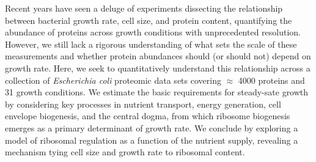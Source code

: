 Recent years have seen a deluge of experiments dissecting the relationship
between bacterial growth rate, cell size, and protein content, quantifying the
abundance of proteins across growth conditions with unprecedented
resolution. However, we still lack a rigorous understanding of what sets the
scale of these measurements and whether protein abundances should (or should not)
depend on growth rate. Here, we seek to quantitatively understand this
relationship across a collection of
\textit{Escherichia coli} proteomic data sets covering $\approx$ 4000 proteins
and 31 growth conditions. We estimate the basic requirements for steady-sate
growth by considering key processes in nutrient transport, energy generation, cell envelope
biogenesis, and the central dogma, from which ribosome biogenesis
emerges as a primary determinant of growth rate. We conclude by exploring a
model of ribosomal regulation as a function of the nutrient supply, revealing a
mechanism tying cell size and growth rate to ribosomal content.
